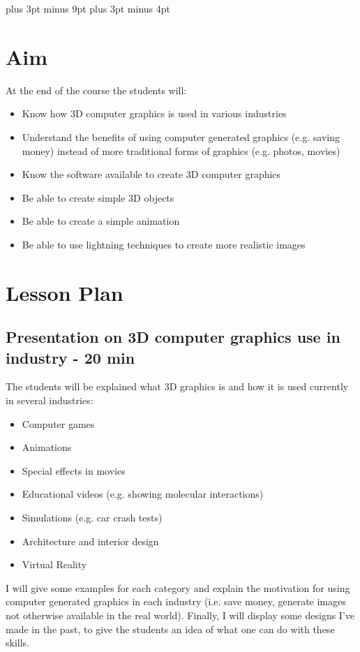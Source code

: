 \documentclass[11pt,a4paper]{report}
\begin{document}
\belowdisplayskip=12pt plus 3pt minus 9pt
\belowdisplayshortskip=7pt plus 3pt minus 4pt



\section{Aim}

At the end of the course the students will:
\begin{itemize}
 \item Know how 3D computer graphics is used in various industries
 \item Understand the benefits of using computer generated graphics (e.g. saving money) instead of more traditional forms of graphics (e.g. photos, movies)
 \item Know the software available to create 3D computer graphics
 \item Be able to create simple 3D objects
 \item Be able to create a simple animation
 \item Be able to use lightning techniques to create more realistic images
\end{itemize}


\section*{Lesson Plan}

\subsection*{Presentation on 3D computer graphics use in industry - 20 min}

The students will be explained what 3D graphics is and how it is used currently in several industries:
\begin{itemize}
 \item Computer games
 \item Animations 
 \item Special effects in movies
 \item Educational videos (e.g. showing molecular interactions)
 \item Simulations (e.g. car crash tests)
 \item Architecture and interior design
 \item Virtual Reality
\end{itemize}

I will give some examples for each category and explain the motivation for using computer generated graphics in each industry (i.e. save money, generate images not otherwise available in the real world). Finally, I will display some designs I've made in the past, to give the students an idea of what one can do with these skills.
\end{document}
